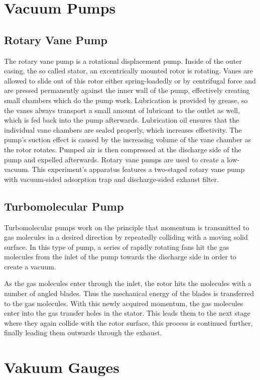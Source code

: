 
\section{Vacuum Pumps}
\subsection{Rotary Vane Pump}
The rotary vane pump is a rotational displacement pump.
Inside of the outer casing, the so called stator, an excentrically mounted rotor is rotating.
Vanes are allowed to slide out of this rotor either spring-loadedly or by centrifugal force and are pressed permanently against the inner wall of the pump, effectively creating small chambers which do the pump work.
Lubrication is provided by grease, so the vanes always transport a small amount of lubricant to the outlet as well, which is fed back into the pump afterwards.
Lubrication oil ensures that the individual vane chambers are sealed properly, which increases effectivity.
The pump's suction effect is caused by the increasing volume of the vane chamber as the rotor rotates.
Pumped air is then compressed at the discharge side of the pump and expelled afterwards.
Rotary vane pumps are used to create a low-vacuum.
This experiment's apparatus features a two-staged rotary vane pump with vacuum-sided adsorption trap and discharge-sided exhaust filter.

\subsection{Turbomolecular Pump}
Turbomolecular pumps work on the principle that momentum is transmitted to gas molecules in a desired direction by repeatedly colliding with a moving solid surface.
In this type of pump, a series of rapidly rotating fans hit the gas molecules from the inlet of the pump towards the discharge side in order to create a vacuum.

As the gas molecules enter through the inlet, the rotor hits the molecules with a number of angled blades.
Thus the mechanical energy of the blades is transferred to the gas molecules.
With this newly acquired momentum, the gas molecules enter into the gas transfer holes in the stator.
This leads them to the next stage where they again collide with the rotor surface, this process is continued further, finally leading them outwards through the exhaust.

\section{Vakuum Gauges}
